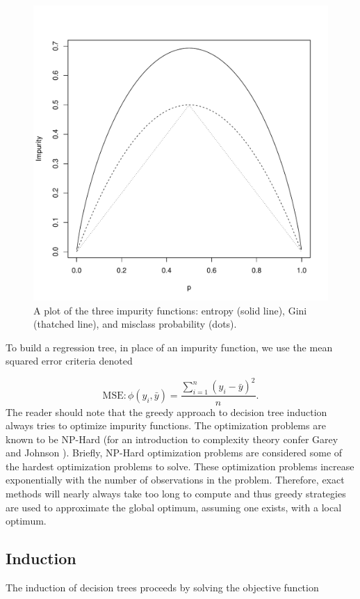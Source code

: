 \begin{figure}[H]
  \centering
  \includegraphics[scale=.7]{figures/impurity_plot.pdf}
  \caption{A plot of the three impurity functions: entropy (solid line), Gini (thatched line), and misclass probability (dots).  }
  \label{fig:impurity}
\end{figure}

To build a regression tree, in place of an impurity function, we use the mean squared error criteria denoted

$$\text{MSE}: \phi(y_i, \bar{y})=\frac{\sum_{i=1}^n(y_i-\bar{y})^2}{n}.$$
The reader should note that the greedy approach to decision tree induction always tries to optimize impurity functions. The optimization problems are known to be NP-Hard (for an introduction to complexity theory confer Garey and Johnson \cite{garey1979computers}). Briefly, NP-Hard optimization problems are considered some of the hardest optimization problems to solve. These optimization problems increase exponentially with the number of observations in the problem. Therefore, exact methods will nearly always take too long to compute and thus greedy strategies are used to approximate the global optimum, assuming one exists, with a local optimum. 
\subsection{Induction}
The induction of decision trees proceeds by solving the objective function

